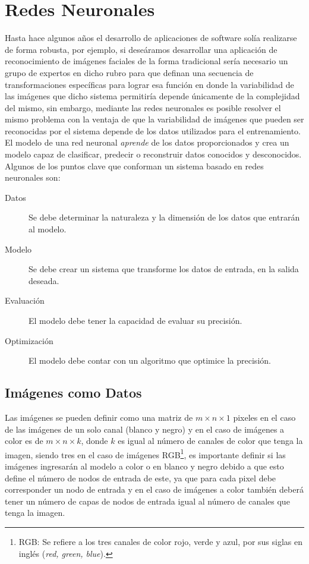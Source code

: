 \section{Redes Neuronales}

Hasta hace algunos años el desarrollo de aplicaciones de software solía realizarse de forma robusta, por ejemplo, si deseáramos desarrollar una aplicación de reconocimiento de imágenes faciales de la forma tradicional sería necesario un grupo de expertos en dicho rubro para que definan una secuencia de transformaciones específicas para lograr esa función en donde la variabilidad de las imágenes que dicho sistema permitiría depende únicamente de la complejidad del mismo, sin embargo, mediante las redes neuronales es posible resolver el mismo problema con la ventaja de que la variabilidad de imágenes que pueden ser reconocidas por el sistema depende de los datos utilizados para el entrenamiento. El modelo de una red neuronal \emph{aprende} de los datos proporcionados y crea un modelo capaz de clasificar, predecir o reconstruir datos conocidos y desconocidos. Algunos de los puntos clave que conforman un sistema basado en redes neuronales son:

\begin{description}
    \item[Datos]{Se debe determinar la naturaleza y la dimensión de los datos que entrarán al modelo.}
    \item[Modelo] {Se debe crear un sistema que transforme los datos de entrada, en la salida deseada.}
    \item[Evaluación] {El modelo debe tener la capacidad de evaluar su precisión.}
    \item[Optimización] {El modelo debe contar con un algoritmo que optimice la precisión.}
\end{description}

\subsection{Imágenes como Datos}
Las imágenes se pueden definir como una matriz de $m \times n \times 1$ pixeles en el caso de las imágenes de un solo canal (blanco y negro) y en el caso de imágenes a color es de $m \times n \times k$, donde $k$ es igual al número de canales de color que tenga la imagen, siendo tres en el caso de imágenes RGB\footnote{RGB: Se refiere a los tres canales de color rojo, verde y azul, por sus siglas en inglés (\emph{red, green, blue}).}, es importante definir si las imágenes ingresarán al modelo a color o en blanco y negro debido a que esto define el número de nodos de entrada de este, ya que para cada pixel debe corresponder un nodo de entrada y en el caso de imágenes a color también deberá tener un número de capas de nodos de entrada igual al número de canales que tenga la imagen.


